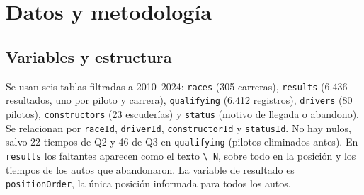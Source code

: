 \documentclass[11pt,a4paper]{article}
\begin{document}
\section{Datos y metodología}

\subsection{Variables y estructura}
Se usan seis tablas filtradas a 2010--2024: \texttt{races} (305 carreras),
\texttt{results} (6.436 resultados, uno por piloto y carrera),
\texttt{qualifying} (6.412 registros), \texttt{drivers} (80 pilotos),
\texttt{constructors} (23 escuderías) y \texttt{status} (motivo de llegada o
abandono). Se relacionan por \texttt{raceId}, \texttt{driverId},
\texttt{constructorId} y \texttt{statusId}. No hay nulos, salvo 22 tiempos
de Q2 y 46 de Q3 en \texttt{qualifying} (pilotos eliminados antes). En
\texttt{results} los faltantes aparecen como el texto \texttt{\textbackslash
N}, sobre todo en la posición y los tiempos de los autos que abandonaron. La
variable de resultado es \texttt{positionOrder}, la única posición informada
para todos los autos.
\end{document}
